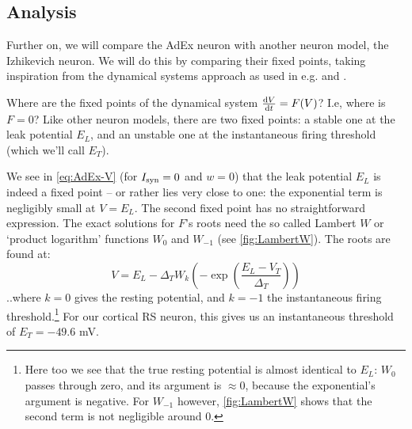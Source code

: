 

\subsection{Analysis}

Further on, we will compare the AdEx neuron with another neuron model, the Izhikevich neuron. We will do this by comparing their fixed points, taking inspiration from the dynamical systems approach as used in e.g. \cite{Strogatz1994NonlinearDynamicsChaos} and \cite{Izhikevich2007DynamicalSystemsNeuroscience}.

Where are the fixed points of the dynamical system $\frac{\mathrm{d}V}{\mathrm{d}t} = F(V)$? I.e, where is $F = 0$? Like other neuron models, there are two fixed points: a stable one at the leak potential $E_L$, and an unstable one at the instantaneous firing threshold (which we'll call $E_T$).

We see in \cref{eq:AdEx-V} (for $I_{\text{syn}} = 0$ and $w = 0$) that the leak potential $E_L$ is indeed a fixed point -- or rather lies very close to one: the exponential term is negligibly small at $V = E_L$.
The second fixed point has no straightforward expression. The exact solutions for $F$'s roots need the so called Lambert $W$ or `product logarithm' functions $W_0$ and $W_{-1}$ (see \cref{fig:LambertW}). The roots are found at:
\begin{equation}
    V = E_L - Δ_T W_k \left( -\exp\left( \frac{E_L - V_T}{Δ_T} \right) \right) \label{eq:LambertW}
\end{equation}
..where $k = 0$ gives the resting potential, and $k = -1$ the instantaneous firing threshold.\footnote{
    Here too we see that the true resting potential is almost identical to $E_L$: $W_0$ passes through zero, and its argument is $≈ 0$, because the exponential's argument is negative. For $W_{-1}$ however, \cref{fig:LambertW} shows that the second term is not negligible around $0$.}
For our cortical RS neuron, this gives us an instantaneous threshold of $E_T = -49.6$ mV.


